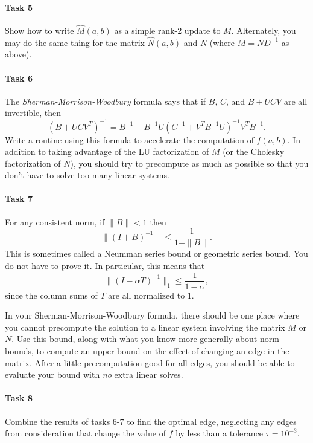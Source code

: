 \documentclass[12pt, leqno]{article}
\begin{document}
\paragraph*{Task 5}
Show how to write $\hat{M}(a,b)$ as a simple rank-2 update to $M$.
Alternately, you may do the same thing for the matrix $\hat{N}(a,b)$
and $N$ (where $M = ND^{-1}$ as above).

\paragraph*{Task 6}
The {\em Sherman-Morrison-Woodbury} formula says that if $B$, $C$, and
$B+UCV$ are all invertible, then
\[
  (B + UCV^T)^{-1} = B^{-1} - B^{-1} U (C^{-1} + V^T B^{-1} U)^{-1} V^T B^{-1}.
\]
Write a routine using this formula
to accelerate the computation of $f(a,b)$.  In addition to taking
advantage of the LU factorization of $M$ (or the Cholesky
factorization of $N$), you should try to precompute as much as
possible so that you don't have to solve too many linear systems.

\paragraph*{Task 7}
For any consistent norm, if $\|B\| < 1$ then
\[
  \|(I+B)^{-1}\| \leq \frac{1}{1-\|B\|}.
\]
This is sometimes called a Neumman series bound or geometric series
bound.  You do not have to prove it.  In particular, this means that
\[
  \|(I-\alpha T)^{-1}\|_{1} \leq \frac{1}{1-\alpha},
\]
since the column sums of $T$ are all normalized to 1.

In your Sherman-Morrison-Woodbury formula, there should be one place
where you cannot precompute the solution to a linear system involving
the matrix $M$ or $N$.  Use this bound, along with what you know more
generally about norm bounds, to compute an upper bound on the effect
of changing an edge in the matrix.  After a little precomputation good
for all edges, you should be able to evaluate your bound with {\em no}
extra linear solves.

\paragraph*{Task 8}
Combine the results of tasks 6-7 to find the optimal edge, neglecting
any edges from consideration that change the value of $f$ by less than
a tolerance $\tau = 10^{-3}$.
\end{document}
